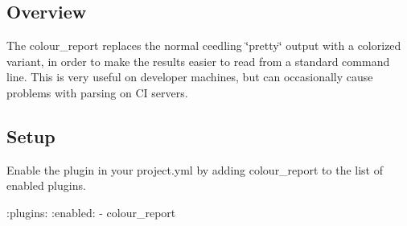 \subsection*{Overview}

The colour\+\_\+report replaces the normal ceedling \char`\"{}pretty\char`\"{} output with a colorized variant, in order to make the results easier to read from a standard command line. This is very useful on developer machines, but can occasionally cause problems with parsing on CI servers.

\subsection*{Setup}

Enable the plugin in your project.\+yml by adding {\ttfamily colour\+\_\+report} to the list of enabled plugins.


\begin{DoxyCode}
:plugins:
  :enabled:
    - colour\_report
\end{DoxyCode}
 